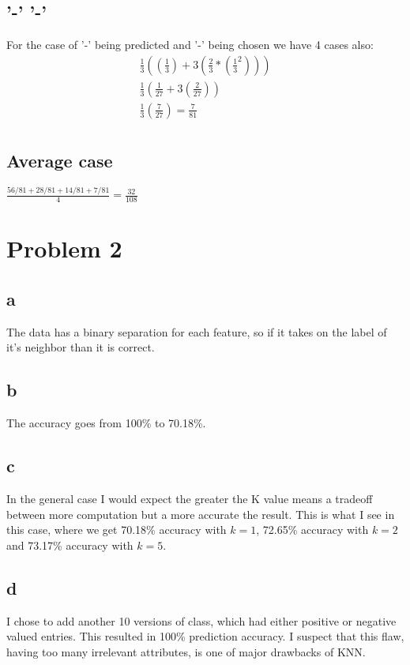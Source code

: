 \documentclass{article}
\begin{document}
\subsection*{'-' '-'}
For the case of '-' being predicted and '-' being chosen we have 4 cases also:\\
\begin{align}
\frac{1}{3}((\frac{1}{3}) + 3 (\frac{2}{3} * (\frac{1}{3}^2)))\\
\frac{1}{3}(\frac{1}{27} + 3(\frac{2}{27}))\\
\frac{1}{3}(\frac{7}{27}) = \frac{7}{81}\\
\end{align}

\subsection*{Average case}
$ \frac{56/81 + 28/81 + 14/81 + 7/81}{4}  = \frac{32}{108}$


\section*{Problem 2}
\subsection*{a}
The data has a binary separation for each feature, so if it takes on the label of it's neighbor than it is correct.\\
\subsection*{b}
The accuracy goes from 100\% to 70.18\%. 
\subsection*{c}
In the general case I would expect the greater the K value means a tradeoff between more computation but a more accurate the result. This is what I see in this case, where we get 70.18\% accuracy with $k = 1$, 72.65\% accuracy with $k = 2$ and 73.17\% accuracy with $k = 5$.\\
\subsection*{d}
I chose to add another 10 versions of class, which had either positive or negative valued entries. This resulted in 100\% prediction accuracy. I suspect that this flaw, having too many irrelevant attributes, is one of major drawbacks of KNN.\\
\end{document}
